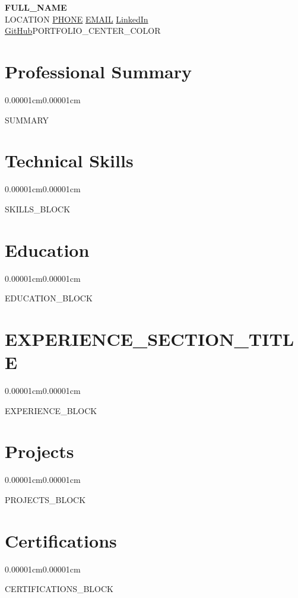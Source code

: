 \documentclass[10pt, letterpaper]{article}
\newenvironment{highlightsforbulletentries}{
    \begin{itemize}[topsep=0.05cm, parsep=0.04cm, partopsep=0pt, itemsep=0pt, leftmargin=12pt]
}{\end{itemize}}
\newenvironment{onecolentry}{
    \begin{adjustwidth}{0.00001cm}{0.00001cm}
}{\end{adjustwidth}}
\let\hrefWithoutArrow\href
\begin{document}
\newsavebox\ANDbox
\sbox\ANDbox{\textcolor{navyblue}{$|$}}
\newcommand{\AND}{\unskip\cleaders\copy\ANDbox\hskip\wd\ANDbox\ignorespaces}

{\centering
    {\fontsize{24pt}{24pt}\selectfont\textbf{{{FULL_NAME}}}}\\[3pt]
    {\small\color{navyblue}
    {{LOCATION}} \quad\textbullet\quad
    \hrefWithoutArrow{tel:{{PHONE_RAW}}}{{{PHONE}}} \quad\textbullet\quad
    \hrefWithoutArrow{mailto:{{EMAIL}}}{{{EMAIL}}} \quad\textbullet\quad
    \hrefWithoutArrow{{{LINKEDIN_URL}}}{LinkedIn} \quad\textbullet\quad
    \hrefWithoutArrow{{{GITHUB_URL}}}{GitHub}{{PORTFOLIO_CENTER_COLOR}}}
\par}
\vspace{6pt}

\section{Professional Summary}
\begin{onecolentry}
    {{SUMMARY}}
\end{onecolentry}

\section{Technical Skills}
\begin{onecolentry}
    {{SKILLS_BLOCK}}
\end{onecolentry}

\section{Education}
\begin{onecolentry}
    {{EDUCATION_BLOCK}}
\end{onecolentry}

\section{{{EXPERIENCE_SECTION_TITLE}}}
\begin{onecolentry}
    {{EXPERIENCE_BLOCK}}
\end{onecolentry}

\section{Projects}
\begin{onecolentry}
    {{PROJECTS_BLOCK}}
\end{onecolentry}

\section{Certifications}
\begin{onecolentry}
    \begin{highlightsforbulletentries}
        {{CERTIFICATIONS_BLOCK}}
    \end{highlightsforbulletentries}
\end{onecolentry}
\end{document}
